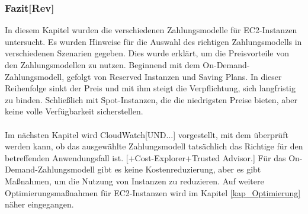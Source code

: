 \subsubsection*{Fazit[Rev]}
In diesem Kapitel wurden die verschiedenen Zahlungsmodelle für EC2-Instanzen untersucht. Es wurden Hinweise für die Auswahl des richtigen Zahlungsmodells in verschiedenen Szenarien gegeben. Dies wurde erklärt, um die Preisvorteile von den Zahlungsmodellen zu nutzen. Beginnend mit dem On-Demand-Zahlungsmodell, gefolgt von Reserved Instanzen und Saving Plans. In dieser Reihenfolge sinkt der Preis und mit ihm steigt die Verpflichtung, sich langfristig zu binden. Schließlich mit Spot-Instanzen, die die niedrigsten Preise bieten, aber keine volle Verfügbarkeit sicherstellen. %
\\\\
Im nächsten Kapitel wird CloudWatch[UND...] vorgestellt, mit dem überprüft werden kann, ob das ausgewählte Zahlungsmodell tatsächlich das Richtige für den betreffenden Anwendungsfall ist. [+Cost-Explorer+Trusted Advisor.] Für das On-Demand-Zahlungsmodell gibt es keine Kostenreduzierung, aber es gibt Maßnahmen, um die Nutzung von Instanzen zu reduzieren. Auf weitere Optimierungsmaßnahmen für EC2-Instanzen wird im Kapitel \ref{kap_Optimierung} näher eingegangen.